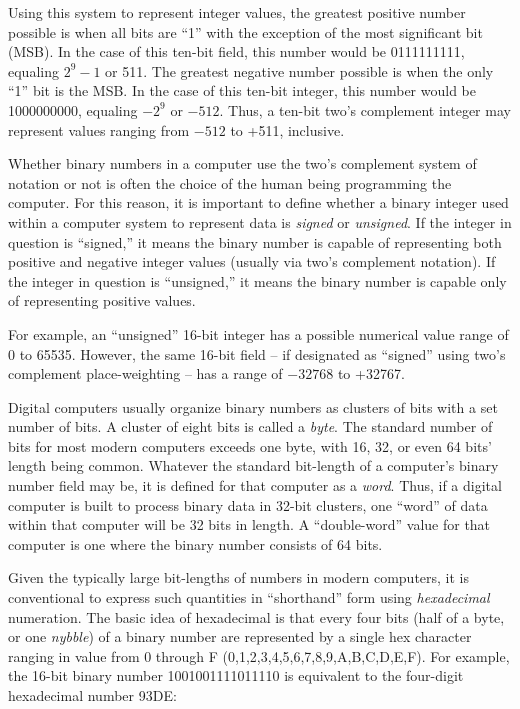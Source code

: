 Using this system to represent integer values, the greatest positive number possible is when all bits are ``1'' with the exception of the most significant bit (MSB).  In the case of this ten-bit field, this number would be 0111111111, equaling $2^9 - 1$ or 511.  The greatest negative number possible is when the only ``1'' bit is the MSB.  In the case of this ten-bit integer, this number would be 1000000000, equaling $-2^9$ or $-512$.  Thus, a ten-bit two's complement integer may represent values ranging from $-512$ to +511, inclusive.

Whether binary numbers in a computer use the two's complement system of notation or not is often the choice of the human being programming the computer.  For this reason, it is important to define whether a binary integer used within a computer system to represent data is \textit{signed} or \textit{unsigned}.  If the integer in question is ``signed,'' it means the binary number is capable of representing both positive and negative integer values (usually via two's complement notation).  If the integer in question is ``unsigned,'' it means the binary number is capable only of representing positive values.    

For example, an ``unsigned'' 16-bit integer has a possible numerical value range of 0 to 65535.  However, the same 16-bit field -- if designated as ``signed'' using two's complement place-weighting -- has a range of $-32768$ to +32767.

\vskip 10pt

Digital computers usually organize binary numbers as clusters of bits with a set number of bits.  A cluster of eight bits is called a \textit{byte}.  The standard number of bits for most modern computers exceeds one byte, with 16, 32, or even 64 bits' length being common.  Whatever the standard bit-length of a computer's binary number field may be, it is defined for that computer as a \textit{word}.  Thus, if a digital computer is built to process binary data in 32-bit clusters, one ``word'' of data within that computer will be 32 bits in length.  A ``double-word'' value for that computer is one where the binary number consists of 64 bits.  

\filbreak

Given the typically large bit-lengths of numbers in modern computers, it is conventional to express such quantities in ``shorthand'' form using \textit{hexadecimal} numeration.  The basic idea of hexadecimal is that every four bits (half of a byte, or one \textit{nybble}) of a binary number are represented by a single hex character ranging in value from 0 through F (0,1,2,3,4,5,6,7,8,9,A,B,C,D,E,F).  For example, the 16-bit binary number 1001001111011110 is equivalent to the four-digit hexadecimal number 93DE:

